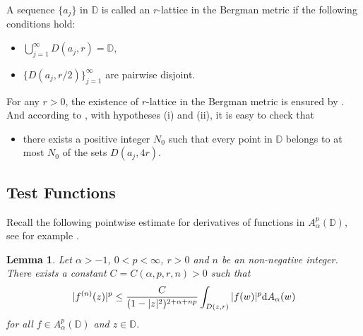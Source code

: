 \documentclass[preprint,12pt,times]{elsarticle}
\newtheorem{lemma}[theorem]{Lemma}
\theoremstyle{definition}
\theoremstyle{remark}
\numberwithin{equation}{section}
\begin{document}
A sequence $\{a_j\}$ in $\mathbb{D}$ is called an $r$-lattice in the Bergman metric if the following conditions hold:
\begin{itemize}
\item[(i)] $\bigcup\limits_{j=1}^{\infty}D(a_j,r)=\mathbb{D}$,
\item[(ii)] $\{D(a_j,r/2)\}_{j=1}^{\infty}$ are pairwise disjoint.
\end{itemize}
For any $r>0$, the existence of $r$-lattice in the Bergman metric is ensured by \cite[Lemma 4.8]{29}. And according to \cite[Lemma 4.7]{29}, with hypotheses (i) and (ii), it is easy to check that
\begin{itemize}
\item[(iii)] there exists a positive integer $N_0$ such that every point in $\mathbb{D}$ belongs to at most $N_0$ of the sets $D(a_j,4r)$. 
\end{itemize}

\subsection{Test Functions}

Recall the following pointwise estimate for derivatives of functions in $A_{\alpha}^p(\mathbb{D})$, see for example \cite[Lemma 2.1]{17}.

\begin{lemma}\label{lemma2.2}
Let $\alpha>-1$, $0<p<\infty$, $r>0$ and $n$ be an non-negative integer. There exists a constant $C=C(\alpha, p,r,n)>0$ such that
\begin{equation*}
|f^{(n)}(z)|^p\leq \frac{C}{(1-|z|^2)^{2+\alpha+np}}\int_{D(z,r)}|f(w)|^p{\rm d}A_{\alpha}(w)
\end{equation*}
for all $f\in A_{\alpha}^p(\mathbb{D})$ and $z\in\mathbb{D}$.
\end{lemma}
\end{document}
